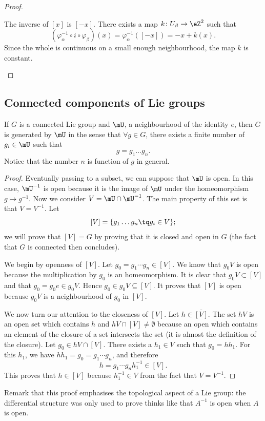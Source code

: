 \begin{proof}
\begin{subproof}
		The inverse of \( [x]\) is \( [-x]\). There exists a map \(k \colon U_{\beta}\to \eZ^2  \) such that
		\begin{equation}
			(\varphi_{\alpha}^{-1}\circ i\circ \varphi_{\beta})(x)=\varphi_{\alpha}^{-1}([-x])=-x+k(x).
		\end{equation}
		Since the whole is continuous on a small enough neighbourhood, the map \( k\) is constant.
	\end{subproof}
\end{proof}

\subsection{Connected components of Lie groups}

\begin{proposition}		\label{PropUssGpGenere}
	If $G$ is a connected Lie group and $\mU$, a neighbourhood of the identity $e$, then $G$ is generated by $\mU$ in the sense that $\forall g\in G$, there exists a finite number of $g_{i}\in \mU$ such that
	\begin{equation}
		g=g_1\ldots g_n.
	\end{equation}
	Notice that the number $n$ is function of $g$ in general.
\end{proposition}

\begin{proof}
	Eventually passing to a subset, we can suppose that $\mU$ is open. In this case, $\mU^{-1}$ is open because it is the image of $\mU$ under the homeomorphism $g\mapsto g^{-1}$. Now we consider $V=\mU\cap\mU^{-1}$. The main property of this set is that $V=V^{-1}$. Let
	\[
		[V]=\{ g_1\ldots g_n\tq g_{i}\in V \};
	\]
	we will prove that $[V]=G$ by proving that it is closed and open in $G$ (the fact that $G$ is connected then concludes).

	We begin by openness of $[V]$. Let $g_0=g_1\cdots g_n\in[V]$. We know that $g_0V$ is open because the multiplication by $g_0$ is an homeomorphism. It is clear that $g_0V\subset [V]$ and that $g_0=g_0e\in g_0V$. Hence $g_0\in g_0V\subseteq[V]$. It proves that $[V]$ is open because $g_0V$ is a neighbourhood of $g_0$ in $[V]$.

	We now turn our attention to the closeness of $[V]$. Let $h\in\overline{ [V] }$. The set $hV$ is an open set which contains $h$ and $hV\cap [V]\neq \emptyset$ because an open which contains an element of the closure of a set intersects the set (it is almost the definition of the closure). Let $g_0\in hV\cap[V]$. There exists a $h_{1}\in V$ such that $g_0=hh_1$. For this $h_1$, we have $hh_1=g_0=g_1\cdots g_n$, and therefore
	\[
		h=g_1\cdots g_n h_1^{-1}\in[V].
	\]
	This proves that $h\in[V]$ because $h_1^{-1}\in V$ from the fact that $V=V^{-1}$.
\end{proof}
Remark that this proof emphasises the topological aspect of a Lie group: the differential structure was only used to prove thinks like that $A^{-1}$ is open when $A$ is open.

